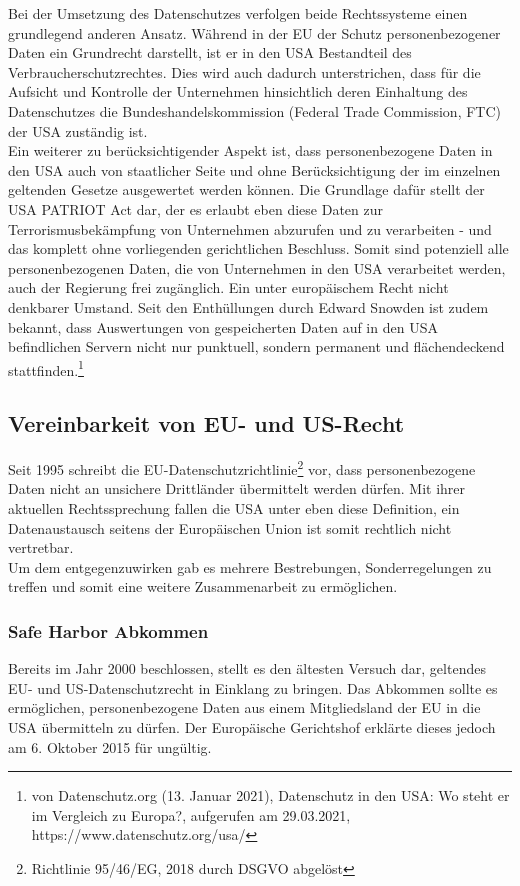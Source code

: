     Bei der Umsetzung des Datenschutzes verfolgen beide Rechtssysteme einen grundlegend anderen Ansatz. Während in der EU der Schutz personenbezogener Daten ein Grundrecht darstellt, ist er in den USA Bestandteil des Verbraucherschutzrechtes. Dies wird auch dadurch unterstrichen, dass für die Aufsicht und Kontrolle der Unternehmen hinsichtlich deren Einhaltung des Datenschutzes die Bundeshandelskommission (Federal Trade Commission, FTC) der USA zuständig ist.\\
    Ein weiterer zu berücksichtigender Aspekt ist, dass personenbezogene Daten in den USA auch von staatlicher Seite und ohne Berücksichtigung der im einzelnen geltenden Gesetze ausgewertet werden können. Die Grundlage dafür stellt der \glqq USA PATRIOT Act\grqq{} dar, der es erlaubt eben diese Daten zur Terrorismusbekämpfung von Unternehmen abzurufen und zu verarbeiten - und das komplett ohne vorliegenden gerichtlichen Beschluss. Somit sind potenziell alle personenbezogenen Daten, die von Unternehmen in den USA verarbeitet werden, auch der Regierung frei zugänglich. Ein unter europäischem Recht nicht denkbarer Umstand. Seit den Enthüllungen durch Edward Snowden ist zudem bekannt, dass Auswertungen von gespeicherten Daten auf in den USA befindlichen Servern nicht nur punktuell, sondern permanent und flächendeckend stattfinden.\footnote{von Datenschutz.org (13. Januar 2021), Datenschutz in den USA: Wo steht er im Vergleich zu Europa?, aufgerufen am 29.03.2021, https://www.datenschutz.org/usa/}

\subsection{Vereinbarkeit von EU- und US-Recht}
    Seit 1995 schreibt die EU-Datenschutzrichtlinie\footnote{Richtlinie 95/46/EG, 2018 durch DSGVO abgelöst} vor, dass personenbezogene Daten nicht an unsichere Drittländer übermittelt werden dürfen. Mit ihrer aktuellen Rechtssprechung fallen die USA unter eben diese Definition, ein Datenaustausch seitens der Europäischen Union ist somit rechtlich nicht vertretbar.\\
    Um dem entgegenzuwirken gab es mehrere Bestrebungen, Sonderregelungen zu treffen und somit eine weitere Zusammenarbeit zu ermöglichen.\\

\subsubsection{Safe Harbor Abkommen}
    Bereits im Jahr 2000 beschlossen, stellt es den ältesten Versuch dar, geltendes EU- und US-Datenschutzrecht in Einklang zu bringen. Das Abkommen sollte es ermöglichen, personenbezogene Daten aus einem Mitgliedsland der EU in die USA übermitteln zu dürfen. Der Europäische Gerichtshof erklärte dieses jedoch am 6. Oktober 2015 für ungültig.\\


